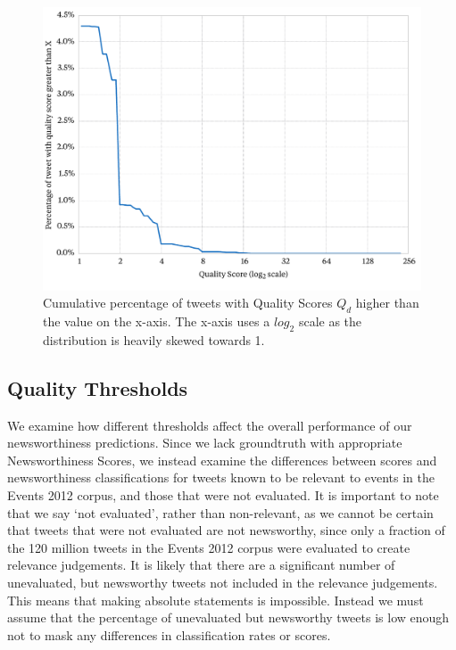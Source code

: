 \begin{figure}[h!]
	\centering
	\includegraphics[width=\textwidth]{Chapters/Newsworthiness/data/positivescores.pdf}
	\caption{Cumulative percentage of tweets with Quality Scores \(Q_d\) higher than the value on the x-axis. The x-axis uses a \(log_2\) scale as the distribution is heavily skewed towards 1.}
	\label{scoring:graphic:highQualityScores}
\end{figure}

\subsection{Quality Thresholds}
We examine how different thresholds affect the overall performance of our newsworthiness predictions.
Since we lack groundtruth with appropriate Newsworthiness Scores, we instead examine the differences between scores and newsworthiness classifications for tweets known to be relevant to events in the Events 2012 corpus, and those that were not evaluated.
It is important to note that we say `not evaluated', rather than non-relevant, as  we cannot be certain that tweets that were not evaluated are not newsworthy, since only a fraction of the 120 million tweets in the Events 2012 corpus were evaluated to create relevance judgements.
It is likely that there are a significant number of unevaluated, but newsworthy tweets not included in the relevance judgements.
This means that making absolute statements is impossible.
Instead we must assume that the percentage of unevaluated but newsworthy tweets is low enough not to mask any differences in classification rates or scores.


